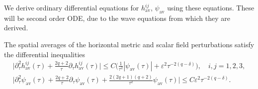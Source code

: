 \documentclass{article}
\newcommand{\av}{\mathrm{av}}
\newcommand{\ve}{\varepsilon}
\newcommand{\pa}{\partial}
\begin{document}
We derive ordinary differential equations for $h_{\av}^{ij}$, $\psi_{\av}$ using these equations. These will be second order ODE, due to the wave equations from which they are derived. 
\begin{lemma}\label{sec:avgsys.lem:odehoriscalar}
    The spatial averages of the horizontal metric and scalar field perturbations satisfy the differential inequalities
    \begin{subequations}
        \begin{gather}
            \Big|\pa_\tau^2 h_{\av}^{ij}(\tau) + \frac{2q+2}{\tau}\pa_\tau  h_{\av}^{ij}(\tau)\Big| \leq C\Big(\frac{1}{\tau^2}|\psi_{\av}(\tau)| + \ve^2\tau^{-2(q-\delta)}\Big),\quad i,j=1,2,3,\label{sec:avgsys.eq:odeavghori}\\
            \Big|\pa_\tau^2 \psi_{\av}(\tau) + \frac{2q+2}{\tau}\pa_\tau \psi_{\av}(\tau) + \frac{2(2q+1)(q+2)}{\tau^2}\psi_{\av}(\tau)\Big| \leq C\ve^2\tau^{-2(q-\delta)}.\label{sec:avgsys.eq:odeavgscalar}
        \end{gather}
    \end{subequations}
\end{lemma}
\end{document}
